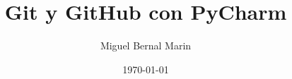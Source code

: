 \documentclass[aspectratio=169]{beamer}
\title[Git y GitHub con PyCharm]{Git y GitHub con PyCharm} %
\author{Miguel Bernal Marin} %
\institute[Escuela] %
{
 Nombre de la Institución\\%
\medskip
\textit{correo} %
}
\date{
    \today
} %
\begin{document}
\begin{frame}
    \titlepage
\end{frame}


\end{document}
